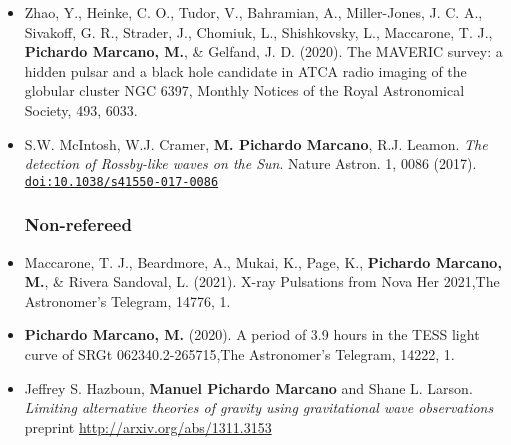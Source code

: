 \documentclass[letterpaper,10pt]{article}
\begin{document}
\begin{itemize}[label=$\blacktriangleright$]
    \item Zhao, Y., Heinke, C. O., Tudor, V., Bahramian, A., Miller-Jones, J. C. A., Sivakoff, G. R., Strader, J., Chomiuk, L., Shishkovsky, L., Maccarone, T. J., \textbf{Pichardo Marcano, M.}, \& Gelfand, J. D. (2020). The MAVERIC survey: a hidden pulsar and a black hole candidate in ATCA radio imaging of the globular cluster NGC 6397, Monthly Notices of the Royal Astronomical Society, 493, 6033. \href{10.1093/mnras/staa631} \\


\item  S.W. McIntosh, W.J. Cramer, \textbf{M. Pichardo Marcano}, R.J. Leamon. \emph{The detection of Rossby-like waves on the Sun}. Nature Astron. 1, 0086 (2017). \href{http://dx.doi.org/10.1038/s41550-017-0086}{\tt doi:10.1038/s41550-017-0086} \\

\subsubsection*{Non-refereed}

\item Maccarone, T. J., Beardmore, A., Mukai, K., Page, K., \textbf{Pichardo Marcano, M.}, \& Rivera Sandoval, L. (2021). X-ray Pulsations from Nova Her 2021,The Astronomer's Telegram, 14776, 1.



\item \textbf{Pichardo Marcano, M.} (2020). A period of 3.9 hours in the TESS light curve of SRGt 062340.2-265715,The Astronomer's Telegram, 14222, 1.

\item  Jeffrey S. Hazboun, \textbf{Manuel Pichardo Marcano} and Shane L. Larson. \emph{Limiting alternative theories of gravity using gravitational wave observations} \\
 preprint \url{http://arxiv.org/abs/1311.3153} \\


\end{itemize}
\end{document}
